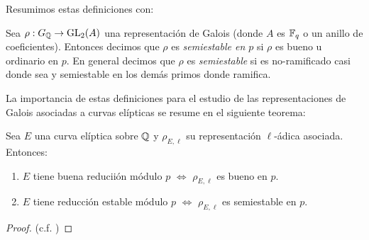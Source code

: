 \documentclass[../../tesis_maestria]{subfiles}
\begin{document}
Resumimos estas definiciones con:

\begin{defin}
  Sea $\rho:G_{\mathbb{Q}}\rightarrow\mathrm{GL}_2(A)$ una representaci\'on de Galois (donde $A$ es $\mathbb{F}_q$ o un anillo de
  coeficientes). Entonces decimos que $\rho$ es \emph{semiestable en $p$} si $\rho$ es bueno u
  ordinario en $p$. En general decimos que $\rho$ es \emph{semiestable} si es no-ramificado casi donde
  sea y semiestable en los dem\'as primos donde ramifica.
\end{defin}

La importancia de estas definiciones para el estudio de las representaciones de Galois asociadas
a curvas el\'ipticas se resume en el siguiente teorema:

\begin{thm}
  Sea $E$ una curva el\'iptica sobre $\mathbb{Q}$ y $\rho_{E,\ell}$ su representaci\'on $\ell$-\'adica
  asociada. Entonces:
  \begin{enumerate}
  \item $E$ tiene buena reducii\'on m\'odulo $p$ $\iff$ $\rho_{E,\ell}$ es bueno en $p$.
  \item $E$ tiene reducci\'on estable m\'odulo $p$ $\iff$ $\rho_{E,\ell}$ es semiestable en $p$.
  \end{enumerate}
\end{thm}

\begin{proof}
  (c.f. \cite[\S3.7, proposici\'on 3.46]{SaitoFLTBT})
\end{proof}
\end{document}

